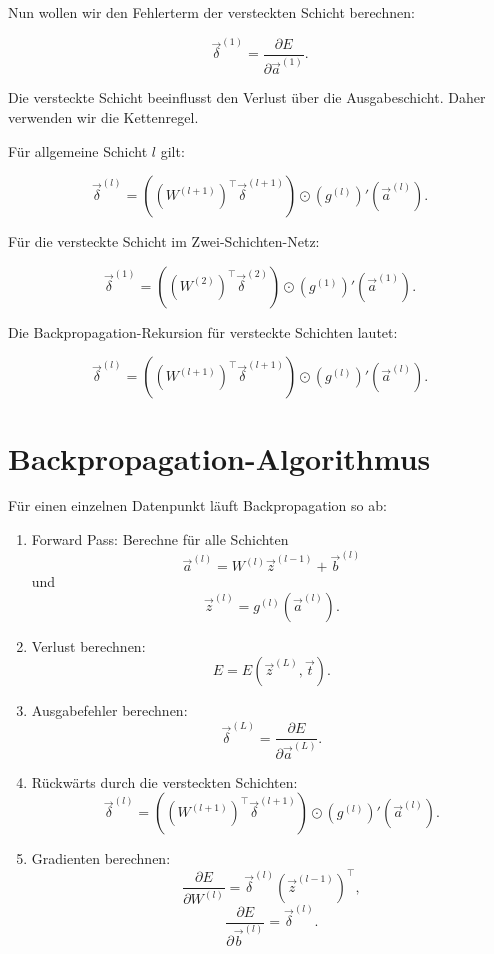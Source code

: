Nun wollen wir den Fehlerterm der versteckten Schicht berechnen:

\[
    \vec{\delta}^{(1)}
    =
    \frac{\partial E}{\partial \vec{a}^{(1)}}.
\]

Die versteckte Schicht beeinflusst den Verlust über die Ausgabeschicht.
Daher verwenden wir die Kettenregel.

Für allgemeine Schicht \(l\) gilt:

\[
    \vec{\delta}^{(l)}
    =
    \left(
        (W^{(l+1)})^{\top}
        \vec{\delta}^{(l+1)}
    \right)
    \odot
    (g^{(l)})'(\vec{a}^{(l)}).
\]

Für die versteckte Schicht im Zwei-Schichten-Netz:

\[
    \vec{\delta}^{(1)}
    =
    \left(
        (W^{(2)})^{\top}
        \vec{\delta}^{(2)}
    \right)
    \odot
    (g^{(1)})'(\vec{a}^{(1)}).
\]

\begin{definitionbox}
Die Backpropagation-Rekursion für versteckte Schichten lautet:

\[
    \vec{\delta}^{(l)}
    =
    \left(
        (W^{(l+1)})^{\top}
        \vec{\delta}^{(l+1)}
    \right)
    \odot
    (g^{(l)})'(\vec{a}^{(l)}).
\]
\end{definitionbox}

\section{Backpropagation-Algorithmus}

Für einen einzelnen Datenpunkt läuft Backpropagation so ab:

\begin{enumerate}
    \item Forward Pass:
    Berechne für alle Schichten
    \[
        \vec{a}^{(l)}
        =
        W^{(l)}\vec{z}^{(l-1)}
        +
        \vec{b}^{(l)}
    \]
    und
    \[
        \vec{z}^{(l)}
        =
        g^{(l)}(\vec{a}^{(l)}).
    \]

    \item Verlust berechnen:
    \[
        E
        =
        E(\vec{z}^{(L)},\vec{t}).
    \]

    \item Ausgabefehler berechnen:
    \[
        \vec{\delta}^{(L)}
        =
        \frac{\partial E}{\partial \vec{a}^{(L)}}.
    \]

    \item Rückwärts durch die versteckten Schichten:
    \[
        \vec{\delta}^{(l)}
        =
        \left(
            (W^{(l+1)})^{\top}
            \vec{\delta}^{(l+1)}
        \right)
        \odot
        (g^{(l)})'(\vec{a}^{(l)}).
    \]

    \item Gradienten berechnen:
    \[
        \frac{\partial E}{\partial W^{(l)}}
        =
        \vec{\delta}^{(l)}
        (\vec{z}^{(l-1)})^{\top},
    \]
    \[
        \frac{\partial E}{\partial \vec{b}^{(l)}}
        =
        \vec{\delta}^{(l)}.
    \]
\end{enumerate}

